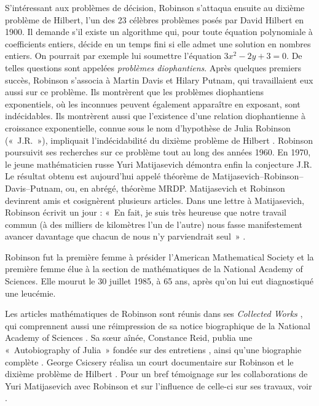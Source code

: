 \documentclass[../../../include/open-logic-section]{subfiles}
\begin{document}
S'intéressant aux problèmes de décision, Robinson s'attaqua ensuite
au dixième problème de Hilbert, l'un des 23 célèbres problèmes posés
par David Hilbert en 1900. Il demande s'il existe un algorithme
qui, pour toute équation polynomiale à coefficients entiers, décide
en un temps fini si elle admet une solution en nombres entiers.
On pourrait par exemple lui soumettre l'équation $3x^2 - 2y +3 = 0$.
De telles questions sont appelées
\emph{problèmes diophantiens}. Après quelques premiers succès,
Robinson s'associa à Martin Davis et Hilary Putnam, qui travaillaient
eux aussi sur ce problème. Ils montrèrent que les problèmes
diophantiens exponentiels, où les inconnues peuvent également
apparaître en exposant, sont indécidables. Ils montrèrent aussi
que l'existence d'une relation diophantienne à croissance
exponentielle, connue sous le nom d'hypothèse de Julia Robinson
(«~J.R.~»), impliquait l'indécidabilité du dixième problème de Hilbert
\citep{DavisPutnamRobinson1961}. Robinson poursuivit ses recherches
sur ce problème tout au long des années 1960. En 1970, le jeune
mathématicien russe Yuri Matijasevich démontra enfin la conjecture
J.R. Le résultat obtenu est aujourd'hui appelé théorème de
Matijasevich--Robinson--Davis--Putnam, ou, en abrégé, théorème MRDP.
Matijasevich et Robinson devinrent amis et cosignèrent plusieurs
articles. Dans une lettre à Matijasevich, Robinson écrivit un jour :
«~En fait, je suis très heureuse que notre travail commun (à des
milliers de kilomètres l'un de l'autre) nous fasse manifestement
avancer davantage que chacun de nous n'y parviendrait seul~»
\citep[45]{Matijasevich1992}.

Robinson fut la première femme à présider l'American Mathematical
Society et la première femme élue à la section de mathématiques de la National Academy of Sciences.
Elle mourut le 30 juillet 1985, à 65 ans, après qu'on lui eut
diagnostiqué une leucémie.

\begin{reading}
Les articles mathématiques de Robinson sont réunis dans ses
\textit{Collected Works} \citep{Robinson1996}, qui comprennent aussi
une réimpression de sa notice biographique de la National Academy of
Sciences \citep{Feferman1994}. Sa sœur aînée, Constance Reid, publia
une «~Autobiography of Julia~» fondée sur des entretiens
\citep{Reid1986}, ainsi qu'une biographie complète
\citep{Reid1996}. George Csicsery réalisa un court documentaire sur
Robinson et le dixième problème de Hilbert \citep{Csicsery2016}.
Pour un bref témoignage sur les collaborations de Yuri Matijasevich
avec Robinson et sur l'influence de celle-ci sur ses travaux, voir
\citep{Matijasevich1992}.
\end{reading}
\end{document}
